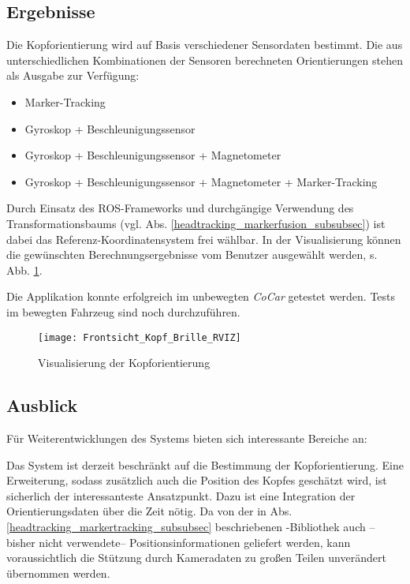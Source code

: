 
\subsection{Ergebnisse}

Die Kopforientierung wird auf Basis verschiedener Sensordaten bestimmt.
Die aus unterschiedlichen Kombinationen der Sensoren berechneten Orientierungen stehen als Ausgabe zur Verfügung:
\begin{itemize}
  \item Marker-Tracking
  \item Gyroskop + Beschleunigungssensor
  \item Gyroskop + Beschleunigungssensor + Magnetometer
  \item Gyroskop + Beschleunigungssensor + Magnetometer + Marker-Tracking
\end{itemize}

Durch Einsatz des \ac{ROS}-Frameworks und durchgängige Verwendung des Transformationsbaums (vgl. Abs. \ref{headtracking_markerfusion_subsubsec}) ist dabei das Referenz-Koordinatensystem frei wählbar.
In der Visualisierung können die gewünschten Berechnungsergebnisse vom Benutzer ausgewählt werden, s. Abb. \ref{fig:kopf_orientierung_rviz}.


Die Applikation konnte erfolgreich im unbewegten \emph{CoCar} getestet werden.
Tests im bewegten Fahrzeug sind noch durchzuführen.


\begin{figure}
  \centering
  \texttt{[image: Frontsicht\_Kopf\_Brille\_RVIZ]}
  \caption{Visualisierung der Kopforientierung}
  \label{fig:kopf_orientierung_rviz}
\end{figure}


\subsection{Ausblick}


Für Weiterentwicklungen des Systems bieten sich interessante Bereiche an:

Das System ist derzeit beschränkt auf die Bestimmung der Kopforientierung.
Eine Erweiterung, sodass zusätzlich auch die Position des Kopfes geschätzt wird, ist sicherlich der interessanteste Ansatzpunkt.
Dazu ist eine Integration der Orientierungsdaten über die Zeit nötig.
Da von der in Abs. \ref{headtracking_markertracking_subsubsec} beschriebenen \alvar-Bibliothek auch --bisher nicht verwendete-- Positionsinformationen geliefert werden, kann voraussichtlich die Stützung durch Kameradaten zu großen Teilen unverändert übernommen werden.

